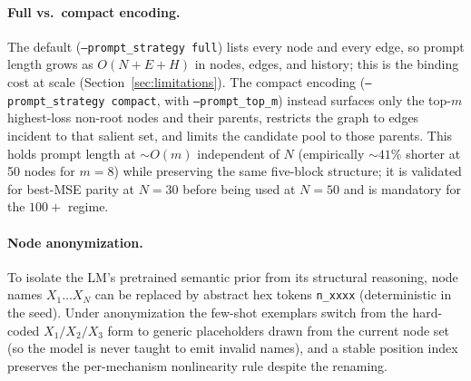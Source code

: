\documentclass[twoside]{article}
\theoremstyle{plain}
\theoremstyle{definition}
\theoremstyle{remark}
\begin{document}
\paragraph{Full vs.\ compact encoding.} The default (\texttt{--prompt\_strategy full}) lists every node and every edge, so prompt length grows as $O(N\!+\!E\!+\!H)$ in nodes, edges, and history; this is the binding cost at scale (Section~\ref{sec:limitations}). The compact encoding (\texttt{--prompt\_strategy compact}, with \texttt{--prompt\_top\_m}) instead surfaces only the top-$m$ highest-loss non-root nodes and their parents, restricts the graph to edges incident to that salient set, and limits the candidate pool to those parents. This holds prompt length at $\sim\!O(m)$ independent of $N$ (empirically $\sim\!41\%$ shorter at 50 nodes for $m{=}8$) while preserving the same five-block structure; it is validated for best-MSE parity at $N{=}30$ before being used at $N{=}50$ and is mandatory for the $100+$ regime.

\paragraph{Node anonymization.} To isolate the LM's pretrained semantic prior from its structural reasoning, node names $X_1\dots X_N$ can be replaced by abstract hex tokens \texttt{n\_xxxx} (deterministic in the seed). Under anonymization the few-shot exemplars switch from the hard-coded $X_1/X_2/X_3$ form to generic placeholders drawn from the current node set (so the model is never taught to emit invalid names), and a stable position index preserves the per-mechanism nonlinearity rule despite the renaming.
\end{document}

